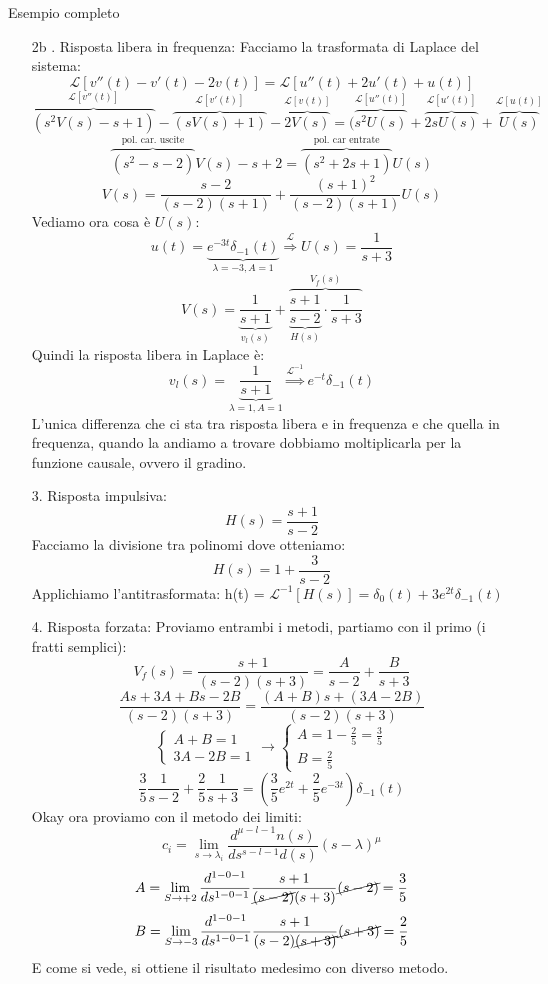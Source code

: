 \documentclass[a4paper]{article}
\begin{document}
\begin{examplebox}{Esempio completo}
\begin{enumerate}
        \item[2b .] Risposta libera in frequenza:
        Facciamo la trasformata di Laplace del sistema:
         \[\mathcal{L}[v''(t) - v'(t) - 2v(t)] = \mathcal{L}[u''(t) + 2u'(t) + u(t)]\]
            \[\overbrace{(s^2V(s) - s + 1)}^{\mathcal{L}[v''(t)]} - \overbrace{(sV(s) + 1)}^{\mathcal{L}[v'(t)]} - \overbrace{2V(s)}^{\mathcal{L}[v(t)]} = (\overbrace{s^2U(s)}^{\mathcal{L}[u''(t)]} + \overbrace{2sU(s)}^{\mathcal{L}[u'(t)]} + \overbrace{U(s)}^{\mathcal{L}[u(t)]}\]
        \[\overbrace{(s^2 - s - 2)}^{\text{pol. car. uscite}}V(s) - s + 2 = \overbrace{(s^2 + 2s + 1)}^{\text{pol. car entrate}}U(s)\]
        \[V(s) = \frac{s - 2}{(s-2)(s+1)} + \frac{(s+1)^2}{(s-2)(s+1)} U(s)\]
        Vediamo ora cosa è $U(s)$:
        \[u(t) = \underbrace{e^{-3t}\delta_{-1}(t)}_{\lambda = -3, A = 1} \stackrel{\mathcal{L}}{\Longrightarrow} U(s) = \frac{1}{s+3}\]
        \[V(s) = \underbrace{\frac{1}{s+1}}_{v_l(s)} + \overbrace{\underbrace{\frac{s+1}{s-2}}_{H(s)} \cdot \frac{1}{s+3}}^{V_f(s)}\]
        Quindi la risposta libera in Laplace è: 
        \[v_l(s) = \underbrace{\frac{1}{s+1}}_{\lambda = 1, A = 1}\stackrel{\mathcal{L}^{-1}}{\Longrightarrow} e^{-t}\delta_{-1}(t)\]
        L'unica differenza che ci sta tra risposta libera e in frequenza e che quella in frequenza, quando la andiamo a trovare
        dobbiamo moltiplicarla per la funzione causale, ovvero il gradino.
        \item[3. ] Risposta impulsiva:
        \[H(s) = \frac{s+1}{s-2}\]
        Facciamo la divisione tra polinomi dove otteniamo:
        \[H(s) = 1 + \frac{3}{s-2}\]
        Applichiamo l'antitrasformata:
        h(t) = $\mathcal{L}^{-1}[H(s)] = \delta_0(t) + 3e^{2t}\delta_{-1}(t)$
        \item[4. ] Risposta forzata: Proviamo entrambi i metodi, partiamo con il primo (i fratti semplici):
        \[V_f(s) = \frac{s+1}{(s-2)(s+3)} = \frac{A}{s-2} + \frac{B}{s+3}\]
        \[\frac{As + 3A + Bs - 2B}{(s-2)(s+3)} = \frac{(A+B)s + (3A - 2B)}{(s-2)(s+3)}\]
        \[\begin{cases}
            A + B = 1\\
            3A - 2B = 1
        \end{cases} \rightarrow \begin{cases}
            A = 1 - \frac{2}{5} = \frac{3}{5}\\
            B = \frac{2}{5}
        \end{cases}\]
        \[\frac{3}{5}\frac{1}{s-2} + \frac{2}{5} \frac{1}{s+3} = \left(\frac{3}{5}e^{2t} + \frac{2}{5}e^{-3t}\right)\delta_{-1}(t)\]
        Okay ora proviamo con il metodo dei limiti:
        \[c_{i} = \lim_{s \rightarrow \lambda_i}\frac{d^{\mu - l - 1}n(s)}{ds^{s-l-1}d(s)}(s-\lambda)^\mu\]
        \[A = \lim_{S \rightarrow +2} \frac{d^{1-0-1}}{ds^{1-0-1}} \frac{s+1}{\cancel{(s-2)}(s+3)}\cancel{(s-2)} = \frac{3}{5}\]
        \[B =\lim_{S \rightarrow -3} \frac{d^{1-0-1}}{ds^{1-0-1}} \frac{s+1}{(s-2)\cancel{(s+3)}}\cancel{(s+3)} = \frac{2}{5} \]
        E come si vede, si ottiene il risultato medesimo con diverso metodo.
    \end{enumerate}
\end{examplebox}
\noindent
\end{document}
